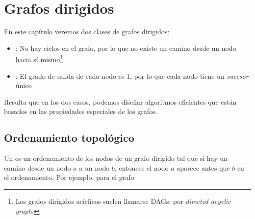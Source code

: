 \chapter{Grafos dirigidos}

En este capítulo veremos dos clases de grafos dirigidos:
\begin{itemize}
    \item {}: No hay ciclos en el grafo, por lo que
          no existe un camino desde un nodo hacia sí mismo\footnote{Los
              grafos dirigidos acíclicos suelen llamarse DAGs, por
              \textit{directed acyclic graph}.}
    \item {}: El grado de salida de cada nodo es 1,
          por lo que cada nodo tiene un \emph{sucesor} único
\end{itemize}

Resulta que en los dos casos, podemos diseñar algoritmos eficientes
que están basados en las propiedades especiales de los grafos.

\section{Ordenamiento topológico}


Un  es un ordenamiento de los nodos
de un grafo dirigido tal que si hay un camino desde un nodo $a$ a un
nodo $b$, entonces el nodo $a$ aparece antes que $b$ en el ordenamiento.
Por ejemplo, para el grafo

\begin{center}
\end{center}

